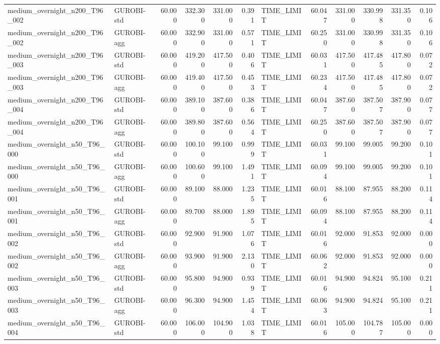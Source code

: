 \begin{table}[htbp]
\begin{tabular}{llrrrrlrrrrr}
medium\_overnight\_n200\_T96\_002 & GUROBI-std & 60.000 & 332.300 & 331.000 & 0.391 & TIME\_LIMIT & 60.047 & 331.000 & 330.998 & 331.350 & 0.106 \\
medium\_overnight\_n200\_T96\_002 & GUROBI-agg & 60.000 & 332.900 & 331.000 & 0.571 & TIME\_LIMIT & 60.250 & 331.000 & 330.998 & 331.350 & 0.106 \\
medium\_overnight\_n200\_T96\_003 & GUROBI-std & 60.000 & 419.200 & 417.500 & 0.406 & TIME\_LIMIT & 60.031 & 417.500 & 417.485 & 417.800 & 0.072 \\
medium\_overnight\_n200\_T96\_003 & GUROBI-agg & 60.000 & 419.400 & 417.500 & 0.453 & TIME\_LIMIT & 60.234 & 417.500 & 417.485 & 417.800 & 0.072 \\
medium\_overnight\_n200\_T96\_004 & GUROBI-std & 60.000 & 389.100 & 387.600 & 0.386 & TIME\_LIMIT & 60.047 & 387.600 & 387.507 & 387.900 & 0.077 \\
medium\_overnight\_n200\_T96\_004 & GUROBI-agg & 60.000 & 389.800 & 387.600 & 0.564 & TIME\_LIMIT & 60.250 & 387.600 & 387.507 & 387.900 & 0.077 \\
medium\_overnight\_n50\_T96\_000 & GUROBI-std & 60.000 & 100.100 & 99.100 & 0.999 & TIME\_LIMIT & 60.031 & 99.100 & 99.005 & 99.200 & 0.101 \\
medium\_overnight\_n50\_T96\_000 & GUROBI-agg & 60.000 & 100.600 & 99.100 & 1.491 & TIME\_LIMIT & 60.094 & 99.100 & 99.005 & 99.200 & 0.101 \\
medium\_overnight\_n50\_T96\_001 & GUROBI-std & 60.000 & 89.100 & 88.000 & 1.235 & TIME\_LIMIT & 60.016 & 88.100 & 87.955 & 88.200 & 0.114 \\
medium\_overnight\_n50\_T96\_001 & GUROBI-agg & 60.000 & 89.700 & 88.000 & 1.895 & TIME\_LIMIT & 60.094 & 88.100 & 87.955 & 88.200 & 0.114 \\
medium\_overnight\_n50\_T96\_002 & GUROBI-std & 60.000 & 92.900 & 91.900 & 1.076 & TIME\_LIMIT & 60.016 & 92.000 & 91.853 & 92.000 & 0.000 \\
medium\_overnight\_n50\_T96\_002 & GUROBI-agg & 60.000 & 93.900 & 91.900 & 2.130 & TIME\_LIMIT & 60.062 & 92.000 & 91.853 & 92.000 & 0.000 \\
medium\_overnight\_n50\_T96\_003 & GUROBI-std & 60.000 & 95.800 & 94.900 & 0.939 & TIME\_LIMIT & 60.016 & 94.900 & 94.824 & 95.100 & 0.211 \\
medium\_overnight\_n50\_T96\_003 & GUROBI-agg & 60.000 & 96.300 & 94.900 & 1.454 & TIME\_LIMIT & 60.063 & 94.900 & 94.824 & 95.100 & 0.211 \\
medium\_overnight\_n50\_T96\_004 & GUROBI-std & 60.000 & 106.000 & 104.900 & 1.038 & TIME\_LIMIT & 60.016 & 105.000 & 104.787 & 105.000 & 0.000 \\

\end{tabular}
\end{table}
